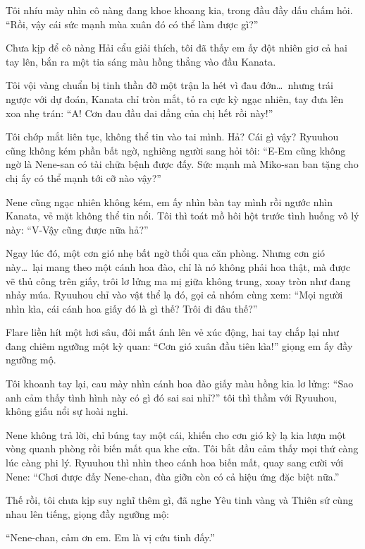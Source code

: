 \documentclass[../main.tex]{subfiles}
\begin{document}
Tôi nhíu mày nhìn cô nàng đang khoe khoang kia, trong đầu đầy dấu chấm hỏi. ``Rồi, vậy cái sức mạnh mùa xuân đó có thể làm được gì?''

Chưa kịp để cô nàng Hải cẩu giải thích, tôi đã thấy em ấy đột nhiên giơ cả hai tay lên, bắn ra một tia sáng màu hồng thẳng vào đầu Kanata.


Tôi vội vàng chuẩn bị tinh thần đỡ một trận la hét vì đau đớn\dots\ nhưng trái ngược với dự đoán, Kanata chỉ tròn mắt, tỏ ra cực kỳ ngạc nhiên, tay đưa lên xoa nhẹ trán: ``A! Cơn đau đầu dai dẳng của chị hết rồi này!''

Tôi chớp mắt liên tục, không thể tin vào tai mình. Hả? Cái gì vậy? Ryuuhou cũng không kém phần bất ngờ, nghiêng người sang hỏi tôi: ``E-Em cũng không ngờ là Nene-san có tài chữa bệnh được đấy. Sức mạnh mà Miko-san ban tặng cho chị ấy có thể mạnh tới cỡ nào vậy?''

Nene cũng ngạc nhiên không kém, em ấy nhìn bàn tay mình rồi ngước nhìn Kanata, vẻ mặt không thể tin nổi. Tôi thì toát mồ hôi hột trước tình huống vô lý này: ``V-Vậy cũng được nữa hả?''

Ngay lúc đó, một cơn gió nhẹ bất ngờ thổi qua căn phòng. Nhưng cơn gió này\dots\ lại mang theo một cánh hoa đào, chỉ là nó không phải hoa thật, mà được vẽ thủ công trên giấy, trôi lơ lửng ma mị giữa không trung, xoay tròn như đang nhảy múa. Ryuuhou chỉ vào vật thể lạ đó, gọi cả nhóm cùng xem: ``Mọi người nhìn kìa, cái cánh hoa giấy đó là gì thế? Trôi đi đâu thế?''

Flare liền hít một hơi sâu, đôi mắt ánh lên vẻ xúc động, hai tay chắp lại như đang chiêm ngưỡng một kỳ quan: ``Cơn gió xuân đầu tiên kìa!'' giọng em ấy đầy ngưỡng mộ.

Tôi khoanh tay lại, cau mày nhìn cánh hoa đào giấy màu hồng kia lơ lửng: ``Sao anh cảm thấy tình hình này có gì đó sai sai nhỉ?'' tôi thì thầm với Ryuuhou, không giấu nổi sự hoài nghi.

Nene không trả lời, chỉ búng tay một cái, khiến cho cơn gió kỳ lạ kia lượn một vòng quanh phòng rồi biến mất qua khe cửa. Tôi bắt đầu cảm thấy mọi thứ càng lúc càng phi lý. Ryuuhou thì nhìn theo cánh hoa biến mất, quay sang cười với Nene: ``Chơi được đấy Nene-chan, đùa giỡn còn có cả hiệu ứng đặc biệt nữa.''

Thế rồi, tôi chưa kịp suy nghĩ thêm gì, đã nghe Yêu tinh vàng và Thiên sứ cùng nhau lên tiếng, giọng đầy ngưỡng mộ:

``Nene-chan, cảm ơn em. Em là vị cứu tinh đấy.''
\end{document}

